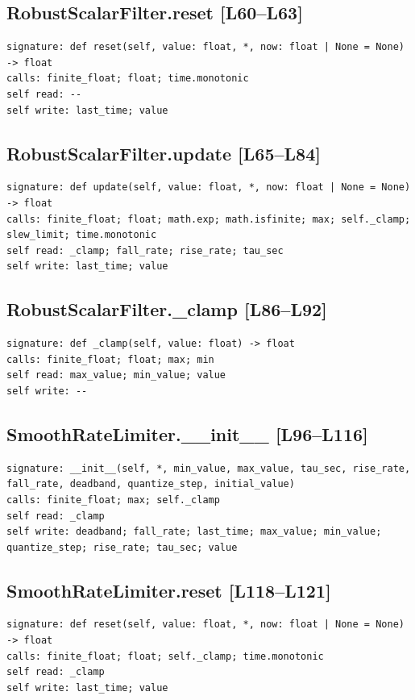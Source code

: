 \documentclass[a4paper,10pt,oneside]{book}
\begin{document}
\subsection*{RobustScalarFilter.reset [L60--L63]}
\begin{lstlisting}[numbers=none]
signature: def reset(self, value: float, *, now: float | None = None) -> float
calls: finite_float; float; time.monotonic
self read: --
self write: last_time; value
\end{lstlisting}
\subsection*{RobustScalarFilter.update [L65--L84]}
\begin{lstlisting}[numbers=none]
signature: def update(self, value: float, *, now: float | None = None) -> float
calls: finite_float; float; math.exp; math.isfinite; max; self._clamp; slew_limit; time.monotonic
self read: _clamp; fall_rate; rise_rate; tau_sec
self write: last_time; value
\end{lstlisting}
\subsection*{RobustScalarFilter.\_clamp [L86--L92]}
\begin{lstlisting}[numbers=none]
signature: def _clamp(self, value: float) -> float
calls: finite_float; float; max; min
self read: max_value; min_value; value
self write: --
\end{lstlisting}
\subsection*{SmoothRateLimiter.\_\_init\_\_ [L96--L116]}
\begin{lstlisting}[numbers=none]
signature: __init__(self, *, min_value, max_value, tau_sec, rise_rate, fall_rate, deadband, quantize_step, initial_value)
calls: finite_float; max; self._clamp
self read: _clamp
self write: deadband; fall_rate; last_time; max_value; min_value; quantize_step; rise_rate; tau_sec; value
\end{lstlisting}
\subsection*{SmoothRateLimiter.reset [L118--L121]}
\begin{lstlisting}[numbers=none]
signature: def reset(self, value: float, *, now: float | None = None) -> float
calls: finite_float; float; self._clamp; time.monotonic
self read: _clamp
self write: last_time; value
\end{lstlisting}
\end{document}

